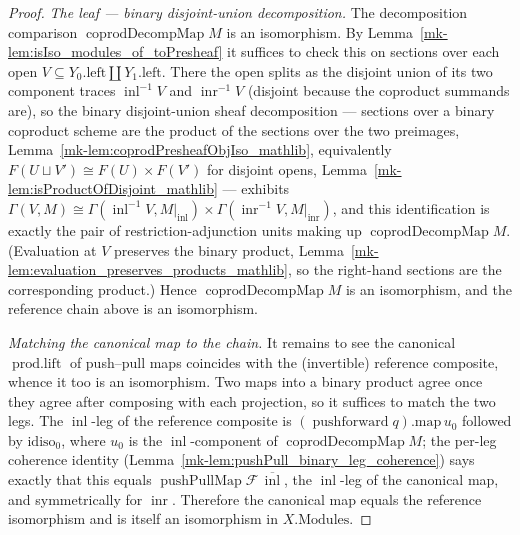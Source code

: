 \begin{proof}
  \emph{The leaf — binary disjoint-union decomposition.} The decomposition comparison
  \(\operatorname{coprodDecompMap} M\) is an isomorphism. By
  Lemma~\ref{mk-lem:isIso_modules_of_toPresheaf} it suffices to check this on sections over each open
  \(V \subseteq Y_0.\mathrm{left} \amalg Y_1.\mathrm{left}\). There the open splits as the disjoint
  union of its two component traces \(\operatorname{inl}^{-1}V\) and \(\operatorname{inr}^{-1}V\)
  (disjoint because the coproduct summands are), so the binary disjoint-union sheaf decomposition ---
  sections over a binary coproduct scheme are the product of the sections over the two preimages,
  Lemma~\ref{mk-lem:coprodPresheafObjIso_mathlib}, equivalently \(F(U \sqcup V') \cong F(U) \times
  F(V')\) for disjoint opens, Lemma~\ref{mk-lem:isProductOfDisjoint_mathlib} --- exhibits \(\Gamma(V, M)
  \cong \Gamma(\operatorname{inl}^{-1}V, M|_{\operatorname{inl}}) \times
  \Gamma(\operatorname{inr}^{-1}V, M|_{\operatorname{inr}})\), and this identification is exactly the
  pair of restriction-adjunction units making up \(\operatorname{coprodDecompMap} M\). (Evaluation at
  \(V\) preserves the binary product, Lemma~\ref{mk-lem:evaluation_preserves_products_mathlib}, so the
  right-hand sections are the corresponding product.) Hence \(\operatorname{coprodDecompMap} M\) is an
  isomorphism, and the reference chain above is an isomorphism.

  \emph{Matching the canonical map to the chain.} It remains to see the canonical
  \(\operatorname{prod.lift}\) of push--pull maps coincides with the (invertible) reference composite,
  whence it too is an isomorphism. Two maps into a binary product agree once they agree after
  composing with each projection, so it suffices to match the two legs. The
  \(\operatorname{inl}\)-leg of the reference composite is \((\operatorname{pushforward} q).\mathrm{map}
  \,u_0\) followed by \(\mathrm{idiso}_0\), where \(u_0\) is the \(\operatorname{inl}\)-component of
  \(\operatorname{coprodDecompMap} M\); the per-leg coherence identity
  (Lemma~\ref{mk-lem:pushPull_binary_leg_coherence}) says exactly that this equals
  \(\operatorname{pushPullMap}\mathcal{F}\,\overline{\operatorname{inl}}\), the \(\operatorname{inl}\)-leg
  of the canonical map, and symmetrically for \(\operatorname{inr}\). Therefore the canonical map
  equals the reference isomorphism and is itself an isomorphism in \(X.\mathrm{Modules}\).
\end{proof}


